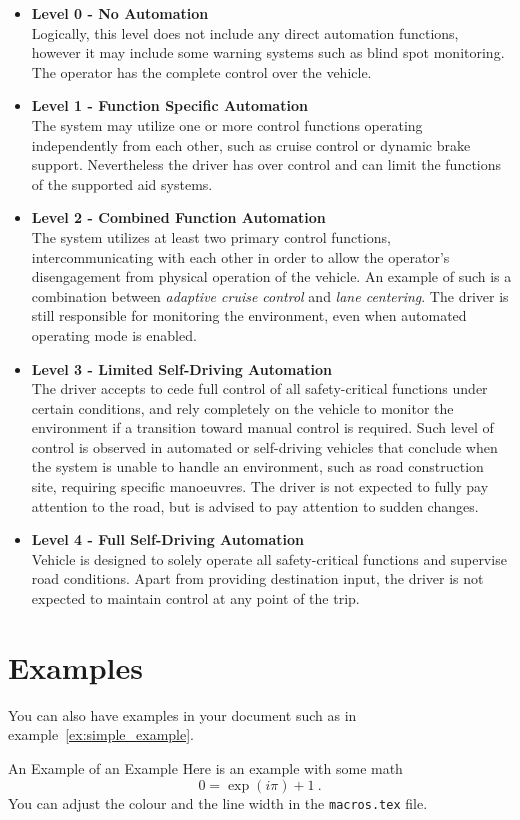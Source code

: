 \begin{itemize}

\item \textbf{Level 0 - No Automation} \\
Logically, this level does not include any direct automation functions, however it may include some warning systems such as blind spot monitoring. The operator has the complete control over the vehicle. 
\item \textbf{Level 1 - Function Specific Automation} \\
The system may utilize one or more control functions operating independently from each other, such as cruise control or dynamic brake support. Nevertheless the driver has over control and can limit the functions of the supported aid systems.
\item \textbf{Level 2 - Combined Function Automation} \\
The system utilizes at least two primary control functions, intercommunicating with each other in order to allow the operator's disengagement from physical operation of the vehicle. An example of such is a combination between \textit{adaptive cruise control} and \textit{lane centering}. The driver is still responsible for monitoring the environment, even when automated operating mode is enabled.
\item \textbf{Level 3 - Limited Self-Driving Automation} \\
The driver accepts to cede full control of all safety-critical functions under certain conditions, and rely completely on the vehicle to monitor the environment if a transition toward manual control is required. Such level of control is observed in automated or self-driving vehicles that conclude when the system is unable to handle an environment, such as road construction site, requiring specific manoeuvres. The driver is not expected to fully pay attention to the road, but is advised to pay attention to sudden changes.
\item \textbf{Level 4 - Full Self-Driving Automation} \\
Vehicle is designed to solely operate all safety-critical functions and supervise road conditions. Apart from providing destination input, the driver is not expected to maintain control at any point of the trip.
  
\end{itemize}



\section{Examples}
You can also have examples in your document such as in example~\ref{ex:simple_example}.
\begin{example}{An Example of an Example}
  \label{ex:simple_example}
  Here is an example with some math
  \begin{equation}
    0 = \exp(i\pi)+1\ .
  \end{equation}
  You can adjust the colour and the line width in the {\tt macros.tex} file.
\end{example}

